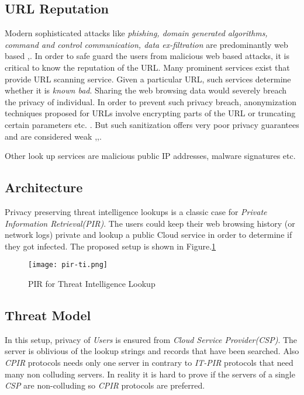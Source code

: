 \documentclass[runningheads,a4paper]{llncs}
\begin{document}
\subsection{URL Reputation}
Modern sophisticated attacks like \emph{phishing, domain generated algorithms, command and control communication, data ex-filtration} are predominantly web based \cite{hutchins2011intelligence},\cite{sanskc}. In order to safe guard the users from malicious web based attacks, it is critical to know the reputation of the URL.  Many prominent services exist that provide URL scanning service\cite{urlbl}. Given a particular URL, such services determine whether it is \emph{known bad}. Sharing the web browsing data would severely breach the privacy of individual. In order to prevent such privacy breach,  anonymization techniques proposed for URLs involve encrypting parts of the URL or truncating certain parameters etc. \cite{kuenning2003anonymization}. But such sanitization offers very poor privacy guarantees and are considered weak \cite{pang2006devil},\cite{coull2008taming},\cite{king2009taxonomy}.

Other look up services are malicious public IP addresses\cite{sb}, malware signatures \cite{mlwr} etc.
\subsection{Architecture}
Privacy preserving threat intelligence lookups is a classic case for \emph{Private Information Retrieval(PIR)}. The users could keep their web browsing history (or network logs) private and lookup a public Cloud service in order to determine if they got infected. The proposed setup is shown in Figure.\ref{fig:pir}
\begin{figure} 
  \begin{center}
    \texttt{[image: pir-ti.png]}
  \end{center}
  \caption{PIR for Threat Intelligence Lookup}
  \label{fig:pir}
\end{figure}
\subsection{Threat Model}
In this setup, privacy of \emph{Users} is ensured from \emph{Cloud Service Provider(CSP)}. The server is oblivious of the lookup strings and records that have been searched. Also \emph{CPIR} protocols needs only one server in contrary to \emph{IT-PIR} protocols that need many non colluding servers. In reality it is hard to prove if the servers of a single \emph{CSP} are non-colluding so \emph{CPIR} protocols are preferred.
\end{document}
